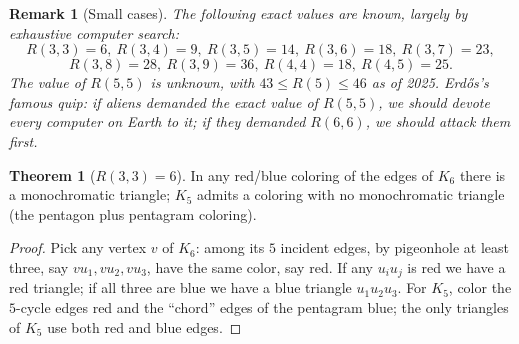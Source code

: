 \documentclass{article}
\newtheorem{remark}{Remark}
\theoremstyle{definition}
\newtheorem{theorem}{Theorem}
\begin{document}
\begin{remark}[Small cases]
The following exact values are known, largely by exhaustive computer
search:
\[
  R(3, 3) = 6,\ R(3, 4) = 9,\ R(3, 5) = 14,\ R(3, 6) = 18,\ R(3, 7) = 23,
\]
\[
  R(3, 8) = 28,\ R(3, 9) = 36,\ R(4, 4) = 18,\ R(4, 5) = 25.
\]
The value of $R(5, 5)$ is unknown, with $43 \le R(5) \le 46$ as of
2025. Erd\H{o}s's famous quip: if aliens demanded the exact value of
$R(5, 5)$, we should devote every computer on Earth to it; if they
demanded $R(6, 6)$, we should attack them first.
\end{remark}

\begin{theorem}[$R(3, 3) = 6$]\label{thm:r33}
In any red/blue coloring of the edges of $K_6$ there is a monochromatic
triangle; $K_5$ admits a coloring with no monochromatic triangle (the
pentagon plus pentagram coloring).
\end{theorem}

\begin{proof}
Pick any vertex $v$ of $K_6$: among its $5$ incident edges, by
pigeonhole at least three, say $vu_1, vu_2, vu_3$, have the same
color, say red. If any $u_i u_j$ is red we have a red triangle; if
all three are blue we have a blue triangle $u_1 u_2 u_3$. For
$K_5$, color the $5$-cycle edges red and the ``chord'' edges of the
pentagram blue; the only triangles of $K_5$ use both red and blue
edges.
\end{proof}
\end{document}
